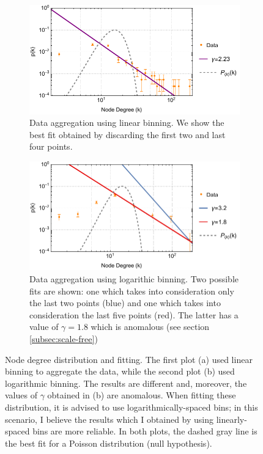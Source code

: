 

\begin{figure}[h]
    \centering
     \begin{subfigure}[h]{\linewidth}
         \centering
         \includegraphics[width=\textwidth]{assets/degreePlotLinSpace.pdf}
         \caption{Data aggregation using linear binning. We show the best fit obtained by discarding the first two and last four points.}
         \label{fig:degree-logloglin}
     \end{subfigure}
     \hfill
     \begin{subfigure}[h]{\linewidth}
         \centering
         \includegraphics[width=\textwidth]{assets/degreePlotLogLog.pdf}
         \caption{Data aggregation using logarithic binning. Two possible fits are shown: one which takes into consideration only the last two points (blue) and one which takes into consideration the last five points (red). The latter has a value of $\gamma = 1.8$ which is anomalous (see section \ref{subsec:scale-free})   }
         \label{fig:degree-logloglog}
     \end{subfigure}
     \caption{Node degree distribution and fitting. The first plot (a) used linear binning to aggregate the data, while the second plot (b) used logarithmic binning. The results are different and, moreover, the values of $\gamma$ obtained in (b) are anomalous. When fitting these distribution, it is advised to use logarithmically-spaced bins; in this scenario, I believe the results which I obtained by using linearly-spaced bins are more reliable. In both plots, the dashed gray line is the best fit for a Poisson distribution (null hypothesis).  }
     \label{fig:degree-loglog}
\end{figure}


